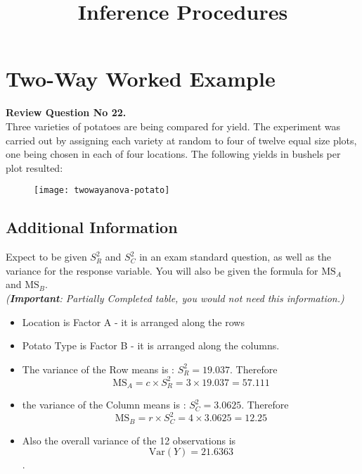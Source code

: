 \documentclass[12pt]{article}
\title{Inference Procedures}
\begin{document}
	
	
\section*{Two-Way Worked Example}

\noindent\textbf{Review Question No 22.} \\

\noindent Three varieties of potatoes are being compared for yield. The experiment
was carried out by assigning each variety at random to four of twelve equal size
plots, one being chosen in each of four locations. The following yields in bushels per 
plot resulted:

\begin{figure}[h!]
	\centering
	\texttt{[image: twowayanova-potato]}
\end{figure}
\subsection*{Additional Information} 
\begin{framed}
	\noindent Expect to be given $S^2_R$ and $S^2_C$ in an exam standard question, as well as the variance for the response variable. You will also be given the formula for $\textrm{MS}_{A}$ and $\textrm{MS}_{B}$.\\
	\textit{(\textbf{Important}: Partially Completed table, you would not need this information.)}
\end{framed}

\begin{itemize}
	\item Location is Factor A - it is arranged along the rows
	\item Potato Type is Factor B - it is arranged along the columns.
\end{itemize}
\begin{itemize}
	\item The variance of the Row means is : $S^2_{R} = 19.037$. Therefore 
	\[ \textrm{MS}_{A} = c \times S^2_{R} = 3 \times 19.037 = 57.111 \]
	
	\item the variance of the Column means is : $S^2_{C} = 3.0625$.	Therefore 
	\[ \textrm{MS}_{B} = r \times S^2_{C} = 4 \times 3.0625 = 12.25\]
	
	\item Also the overall variance of the 12 observations is \[\textrm{Var}(Y) = 21.6363 \]. 
\end{itemize}
\end{document}
